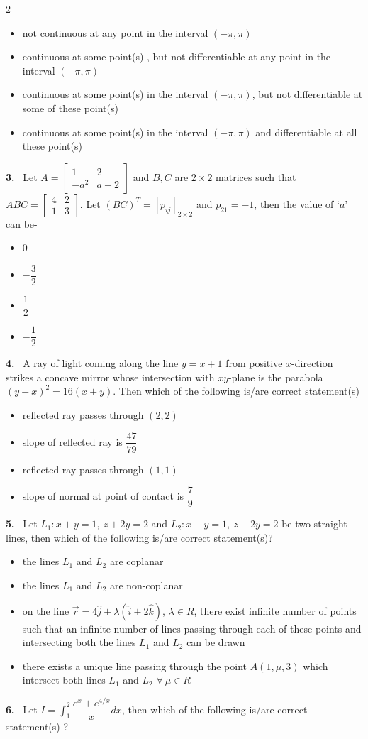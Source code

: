 \documentclass[10pt]{extarticle}
\newcommand{\qn}[1]{\par\smallskip\noindent\textbf{#1.}~}
\newenvironment{qoptions}{\begin{itemize}[leftmargin=1.8em,itemsep=1pt,topsep=2pt,label={}]}{\end{itemize}}
\newcommand{\opt}[2]{\item[(#1)] #2}
\begin{document}
\begin{multicols}{2}
\begin{qoptions}
\opt{A}{not continuous at any point in the interval $(-\pi,\pi)$}
\opt{B}{continuous at some point(s) , but not differentiable at any point in the interval $(-\pi,\pi)$}
\opt{C}{continuous at some point(s) in the interval $(-\pi,\pi)$, but not differentiable at some of these point(s)}
\opt{D}{continuous at some point(s) in the interval $(-\pi,\pi)$ and differentiable at all these point(s)}
\end{qoptions}
\qn{3} Let $A=\begin{bmatrix}1&2\\-a^2&a+2\end{bmatrix}$ and $B,C$ are $2\times2$ matrices such that $ABC=\begin{bmatrix}4&2\\1&3\end{bmatrix}$. Let $(BC)^T=[p_{ij}]_{2\times2}$ and $p_{21}=-1$, then the value of `$a$' can be-
\begin{qoptions}
\opt{A}{0}
\opt{B}{$-\dfrac32$}
\opt{C}{$\dfrac12$}
\opt{D}{$-\dfrac12$}
\end{qoptions}
\qn{4} A ray of light coming along the line $y=x+1$ from positive $x$-direction strikes a concave mirror whose intersection with $xy$-plane is the parabola $(y-x)^2=16(x+y)$. Then which of the following is/are correct statement(s)
\begin{qoptions}
\opt{A}{reflected ray passes through $(2,2)$}
\opt{B}{slope of reflected ray is $\dfrac{47}{79}$}
\opt{C}{reflected ray passes through $(1,1)$}
\opt{D}{slope of normal at point of contact is $\dfrac79$}
\end{qoptions}
\qn{5} Let $L_1:x+y=1,\ z+2y=2$ and $L_2:x-y=1,\ z-2y=2$ be two straight lines, then which of the following is/are correct statement(s)?
\begin{qoptions}
\opt{A}{the lines $L_1$ and $L_2$ are coplanar}
\opt{B}{the lines $L_1$ and $L_2$ are non-coplanar}
\opt{C}{on the line $\vec r=4\hat j+\lambda(\hat i+2\hat k)$, $\lambda\in R$, there exist infinite number of points such that an infinite number of lines passing through each of these points and intersecting both the lines $L_1$ and $L_2$ can be drawn}
\opt{D}{there exists a unique line passing through the point $A(1,\mu,3)$ which intersect both lines $L_1$ and $L_2$ $\forall\ \mu\in R$}
\end{qoptions}
\qn{6} Let $I=\displaystyle\int_1^2\dfrac{e^x+e^{4/x}}{x}dx$, then which of the following is/are correct statement(s) ?
\begin{qoptions}

\end{qoptions}
\end{multicols}
\end{document}
